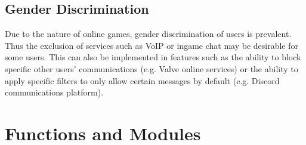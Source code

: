 \documentclass[12pt, DIV=calc]{scrartcl}
\begin{document}
\subsection{Gender Discrimination}
Due to the nature of online games, gender discrimination of users is prevalent. Thus the exclusion of services such as VoIP or ingame chat may be desirable for some users. This can also be implemented in features such as the ability to block specific other users' communications (e.g. Valve online services) or the ability to apply specific filters to only allow certain messages by default (e.g. Discord communications platform). 

\clearpage
\section{Functions and Modules}
\end{document}
